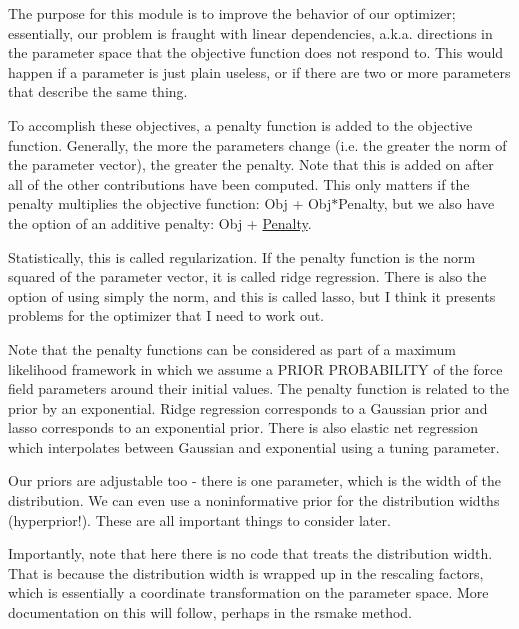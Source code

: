 The purpose for this module is to improve the behavior of our optimizer; essentially, our problem is fraught with \textquotesingle{}linear dependencies\textquotesingle{}, a.\+k.\+a. directions in the parameter space that the objective function does not respond to. This would happen if a parameter is just plain useless, or if there are two or more parameters that describe the same thing.

To accomplish these objectives, a penalty function is added to the objective function. Generally, the more the parameters change (i.\+e. the greater the norm of the parameter vector), the greater the penalty. Note that this is added on after all of the other contributions have been computed. This only matters if the penalty \textquotesingle{}multiplies\textquotesingle{} the objective function\+: Obj + Obj$\ast$\+Penalty, but we also have the option of an additive penalty\+: Obj + \hyperlink{classsrc_1_1objective_1_1Penalty}{Penalty}.

Statistically, this is called regularization. If the penalty function is the norm squared of the parameter vector, it is called ridge regression. There is also the option of using simply the norm, and this is called lasso, but I think it presents problems for the optimizer that I need to work out.

Note that the penalty functions can be considered as part of a \textquotesingle{}maximum likelihood\textquotesingle{} framework in which we assume a P\+R\+I\+OR P\+R\+O\+B\+A\+B\+I\+L\+I\+TY of the force field parameters around their initial values. The penalty function is related to the prior by an exponential. Ridge regression corresponds to a Gaussian prior and lasso corresponds to an exponential prior. There is also \textquotesingle{}elastic net regression\textquotesingle{} which interpolates between Gaussian and exponential using a tuning parameter.

Our priors are adjustable too -\/ there is one parameter, which is the width of the distribution. We can even use a noninformative prior for the distribution widths (hyperprior!). These are all important things to consider later.

Importantly, note that here there is no code that treats the distribution width. That is because the distribution width is wrapped up in the rescaling factors, which is essentially a coordinate transformation on the parameter space. More documentation on this will follow, perhaps in the \textquotesingle{}rsmake\textquotesingle{} method. 

